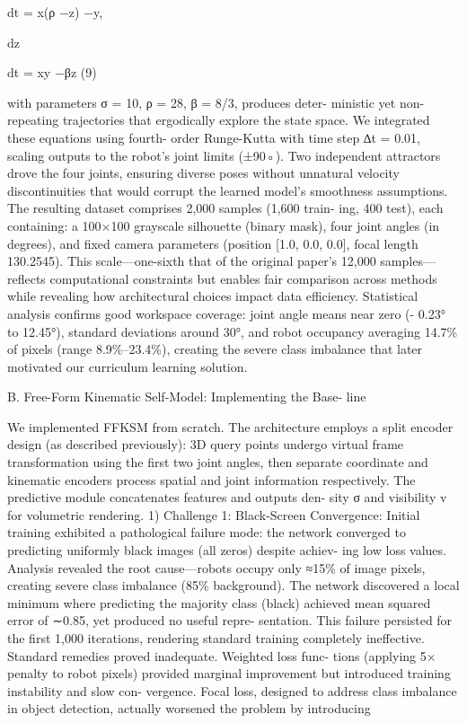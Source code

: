 \documentclass[10pt,twocolumn,letterpaper]{article}
\begin{document}
dt = x(ρ −z) −y,

dz

dt = xy −βz (9)

with parameters σ = 10, ρ = 28, β = 8/3, produces deter- ministic yet non-repeating trajectories that ergodically explore the state space. We integrated these equations using fourth- order Runge-Kutta with time step ∆t = 0.01, scaling outputs to the robot’s joint limits (±90◦). Two independent attractors drove the four joints, ensuring diverse poses without unnatural velocity discontinuities that would corrupt the learned model’s smoothness assumptions. The resulting dataset comprises 2,000 samples (1,600 train- ing, 400 test), each containing: a 100×100 grayscale silhouette (binary mask), four joint angles (in degrees), and fixed camera parameters (position [1.0, 0.0, 0.0], focal length 130.2545). This scale—one-sixth that of the original paper’s 12,000 samples—reflects computational constraints but enables fair comparison across methods while revealing how architectural choices impact data efficiency. Statistical analysis confirms good workspace coverage: joint angle means near zero (- 0.23° to 12.45°), standard deviations around 30°, and robot occupancy averaging 14.7\% of pixels (range 8.9\%–23.4\%), creating the severe class imbalance that later motivated our curriculum learning solution.

B. Free-Form Kinematic Self-Model: Implementing the Base- line

We implemented FFKSM from scratch. The architecture employs a split encoder design (as described previously): 3D query points undergo virtual frame transformation using the first two joint angles, then separate coordinate and kinematic encoders process spatial and joint information respectively. The predictive module concatenates features and outputs den- sity σ and visibility v for volumetric rendering. 1) Challenge 1: Black-Screen Convergence: Initial training exhibited a pathological failure mode: the network converged to predicting uniformly black images (all zeros) despite achiev- ing low loss values. Analysis revealed the root cause—robots occupy only ≈15\% of image pixels, creating severe class imbalance (85\% background). The network discovered a local minimum where predicting the majority class (black) achieved mean squared error of ∼0.85, yet produced no useful repre- sentation. This failure persisted for the first 1,000 iterations, rendering standard training completely ineffective. Standard remedies proved inadequate. Weighted loss func- tions (applying 5× penalty to robot pixels) provided marginal improvement but introduced training instability and slow con- vergence. Focal loss, designed to address class imbalance in object detection, actually worsened the problem by introducing
\end{document}
